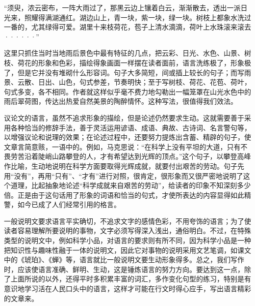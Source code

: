 “须臾，浓云密布，一阵大雨过了，那黑云边上镶着白云，渐渐散去，透出一派日光来，照耀得满湖通红。湖边山上，青一块，紫一块，绿一块。树枝上都象水洗过一番的，尤其绿得可爱。湖里十来枝荷花，苞子上清水滴滴，荷叶上水珠滚来滚去······”

这里只抓住当时当地雨后景色中最有特征的几点，把云彩、日光、水色、山景、树枝、荷花的形象和色彩，描绘得象画面一样摆在读者面前，语言洗练极了，形象极了，但是它并没有堆砌什么形容词。句子大多简短，间或插上较长的句子；而写雨景、云散、日出、山色，句式参差，节奏明快；至于写树枝、荷花、花苞、荷叶，句式多变，各不相同。作者就这样似乎毫不费力地勾勒出一幅笼罩在山光水色中的雨后翠荷图，传达出热爱自然美景的陶醉情怀。这种写法，很值得我们效法。

议论文的语言，虽然不追求形象的描绘，但是论述仍然要求生动。这就需要善于采用各种恰当的修辞手法，善于灵活运用谚语、成语、典故、古诗词、名言警句等，以增强议论和说理的效果；在论述过程中，还要努力提炼出含蓄、精辟的句子，使文章言简意赅，一语中的。例如，马克思说：“在科学上没有平坦的大道，只有不畏劳苦沿着陡峭山路攀登的人，才有希望达到光辉的顶点。”这个句子，以攀登高峰作比喻，生动地说明在科学方面要取得光辉成就，就要付出艰苦的劳动。句子先用“没有”，再用“只有”、“才有”进行对照，很肯定，很形象而又很严密地说明了这个道理，比起抽象地论述“科学成就来自艰苦的劳动”，给读者的印象不知深刻多少倍。正是由于这句话用了形象的词语和恰当的句式，才使所表达的内容显得如此精警，如今已成了人们经常引用的格言。

一般说明文要求语言平实确切，不追求文字的感情色彩，不用夸饰的语言；为了使读者容易理解所要说明的事物，文字必须写得深入浅出，通俗明白。不过，在特殊类型的说明文中，例如科学小品，对语言的要求则有所不同，因为科学小品是一种把知识性与趣味性融于一体的说明文，因此它对事物的说明采用文艺笔调，如课文中的《琥珀》、《蝉》等，语言就比一般说明文要生动形象得多。总之，我们写作时，应该使语言准确、鲜明、生动，这是锤炼语言的努力方向。要达到这一点，除了上面所说的以外，还得平时多积累丰富的词汇，多作变化句型的练习，特别是有意识地学习活在人民口头中的语言，这样才可能在行文时得心应手，写出语言精彩的文章来。
\newpage